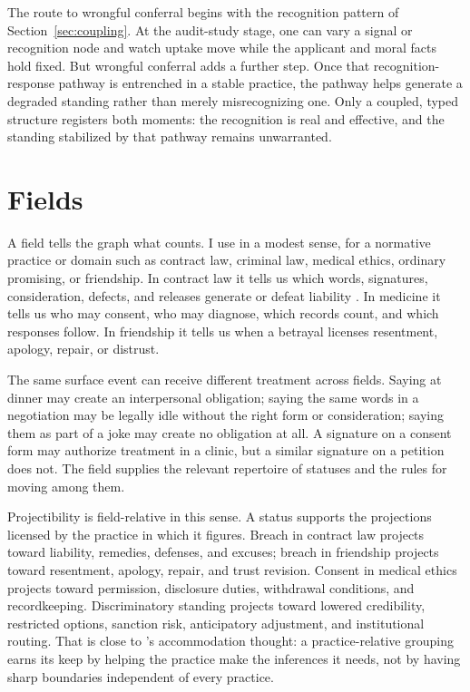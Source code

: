 \documentclass[12pt]{article}
\begin{document}
The route to wrongful conferral begins with the recognition pattern of Section~\ref{sec:coupling}. At the audit-study stage, one can vary a signal or recognition node and watch uptake move while the applicant and moral facts hold fixed. But wrongful conferral adds a further step. Once that recognition-response pathway is entrenched in a stable practice, the pathway helps generate a degraded standing rather than merely misrecognizing one. Only a coupled, typed structure registers both moments: the recognition is real and effective, and the standing stabilized by that pathway remains unwarranted.

\section{Fields}
\label{sec:fields}

A field tells the graph what counts. I use  in a modest sense, for a normative practice or domain such as contract law, criminal law, medical ethics, ordinary promising, or friendship. In contract law it tells us which words, signatures, consideration, defects, and releases generate or defeat liability \citep{americanLawInstitute1981RestatementContracts}. In medicine it tells us who may consent, who may diagnose, which records count, and which responses follow. In friendship it tells us when a betrayal licenses resentment, apology, repair, or distrust.

The same surface event can receive different treatment across fields. Saying  at dinner may create an interpersonal obligation; saying the same words in a negotiation may be legally idle without the right form or consideration; saying them as part of a joke may create no obligation at all. A signature on a consent form may authorize treatment in a clinic, but a similar signature on a petition does not. The field supplies the relevant repertoire of statuses and the rules for moving among them.

Projectibility is field-relative in this sense. A status supports the projections licensed by the practice in which it figures. Breach in contract law projects toward liability, remedies, defenses, and excuses; breach in friendship projects toward resentment, apology, repair, and trust revision. Consent in medical ethics projects toward permission, disclosure duties, withdrawal conditions, and recordkeeping. Discriminatory standing projects toward lowered credibility, restricted options, sanction risk, anticipatory adjustment, and institutional routing. That is close to \textcite{boyd1999}'s accommodation thought: a practice-relative grouping earns its keep by helping the practice make the inferences it needs, not by having sharp boundaries independent of every practice.
\end{document}
